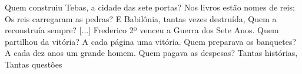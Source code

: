 
\begin{epigrafe}%
Quem construiu Tebas, a cidade das sete portas?
Nos livros estão nomes de reis;
Os reis carregaram as pedras?
E Babilônia, tantas vezes destruída,
Quem a reconstruía sempre?
[...]
Frederico 2º venceu a Guerra dos Sete Anos.
Quem partilhou da vitória?
A cada página uma vitória.
Quem preparava os banquetes?
A cada dez anos um grande homem.
Quem pagava as despesas?
Tantas histórias,
Tantas questões \cite{Brecht1966Perguntas}
\end{epigrafe}
